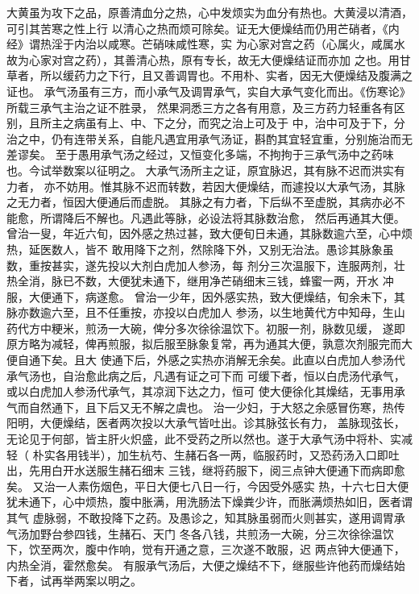 \documentclass[a4paper,12pt,UTF8,twoside]{ctexbook}
\begin{document}
大黄虽为攻下之品，原善清血分之热，心中发烦实为血分有热也。大黄浸以清酒，可引其苦寒之性上行 
以清心之热而烦可除矣。证无大便燥结而仍用芒硝者，《内经》谓热淫于内治以咸寒。芒硝味咸性寒，实 
为心家对宫之药（心属火，咸属水故为心家对宫之药），其善清心热，原有专长，故无大便燥结证而亦加 
之也。用甘草者，所以缓药力之下行，且又善调胃也。不用朴、实者，因无大便燥结及腹满之证也。 
承气汤虽有三方，而小承气及调胃承气，实自大承气变化而出。《伤寒论》所载三承气主治之证不胜录， 
然果洞悉三方之各有用意，及三方药力轻重各有区别，且所主之病虽有上、中、下之分，而究之治上可及于 
中，治中可及于下，分治之中，仍有连带关系，自能凡遇宜用承气汤证，斟酌其宜轻宜重，分别施治而无差谬矣。 
至于愚用承气汤之经过，又恒变化多端，不拘拘于三承气汤中之药味也。今试举数案以征明之。 
大承气汤所主之证，原宜脉迟，其有脉不迟而洪实有力者， 
亦不妨用。惟其脉不迟而转数，若因大便燥结，而遽投以大承气汤，其脉之无力者，恒因大便通后而虚脱。 
其脉之有力者，下后纵不至虚脱，其病亦必不能愈，所谓降后不解也。凡遇此等脉，必设法将其脉数治愈， 
然后再通其大便。 
曾治一叟，年近六旬，因外感之热过甚，致大便旬日未通，其脉数逾六至，心中烦热，延医数人，皆不 
敢用降下之剂，然除降下外，又别无治法。愚诊其脉象虽数，重按甚实，遂先投以大剂白虎加人参汤，每 
剂分三次温服下，连服两剂，壮热全消，脉已不数，大便犹未通下，继用净芒硝细末三钱，蜂蜜一两，开水 
冲服，大便通下，病遂愈。 
曾治一少年，因外感实热，致大便燥结，旬余未下，其脉亦数逾六至，且不任重按，亦投以白虎加人 
参汤，以生地黄代方中知母，生山药代方中粳米，煎汤一大碗，俾分多次徐徐温饮下。初服一剂，脉数见缓， 
遂即原方略为减轻，俾再煎服，拟后服至脉象复常，再为通其大便，孰意次剂服完而大便自通下矣。且大 
使通下后，外感之实热亦消解无余矣。此直以白虎加人参汤代承气汤也，自治愈此病之后，凡遇有证之可下而 
可缓下者，恒以白虎汤代承气，或以白虎加人参汤代承气，其凉润下达之力，恒可 
使大便徐化其燥结，无事用承气而自然通下，且下后又无不解之虞也。 
治一少妇，于大怒之余感冒伤寒，热传阳明，大便燥结，医者两次投以大承气皆吐出。诊其脉弦长有力， 
盖脉现弦长，无论见于何部，皆主肝火炽盛，此不受药之所以然也。遂于大承气汤中将朴、实减轻（ 
朴实各用钱半），加生杭芍、生赭石各一两，临服药时，又恐药汤入口即吐出，先用白开水送服生赭石细末 
三钱，继将药服下，阅三点钟大便通下而病即愈矣。 
又治一人素伤烟色，平日大便七八日一行，今因受外感实 
热，十六七日大便犹未通下，心中烦热，腹中胀满，用洗肠法下燥粪少许，而胀满烦热如旧，医者谓其气 
虚脉弱，不敢投降下之药。及愚诊之，知其脉虽弱而火则甚实，遂用调胃承气汤加野台参四钱，生赭石、天门 
冬各八钱，共煎汤一大碗，分三次徐徐温饮下，饮至两次，腹中作响，觉有开通之意，三次遂不敢服，迟 
两点钟大便通下，内热全消，霍然愈矣。 
有服承气汤后，大便之燥结不下，继服些许他药而燥结始下者，试再举两案以明之。 
\end{document}
